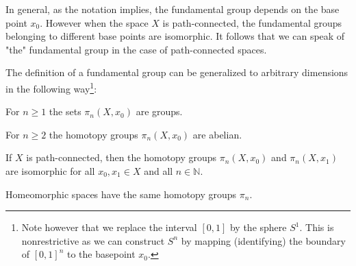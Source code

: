 	\begin{property}
		In general, as the notation implies, the fundamental group depends on the base point $x_0$. However when the space $X$ is path-connected, the fundamental groups belonging to different base points are isomorphic. It follows that we can speak of "the" fundamental group in the case of path-connected spaces.
	\end{property}
	
	
	The definition of a fundamental group can be generalized to arbitrary dimensions in the following way\footnote{Note however that we replace the interval $[0, 1]$ by the sphere $S^1$. This is nonrestrictive as we can construct $S^n$ by mapping (identifying) the boundary of $[0,1]^n$ to the basepoint $x_0$.}:
	
	\begin{property}
		For $n\geq1$ the sets $\pi_n(X, x_0)$ are groups.
	\end{property}
		\begin{property}
		For $n\geq2$  the homotopy groups $\pi_n(X, x_0)$ are abelian.
	\end{property}
	
	\begin{property}
		If $X$ is path-connected, then the homotopy groups $\pi_n(X, x_0)$ and $\pi_n(X, x_1)$ are isomorphic for all $x_0, x_1\in X$ and all $n\in\mathbb{N}$.
	\end{property}
	\begin{property}
		Homeomorphic spaces have the same homotopy groups $\pi_n$.
	\end{property}
	
